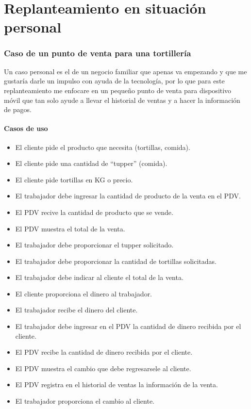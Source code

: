 \documentclass[spanish,12pt,letterpapper]{article}
\begin{document}
	\part{Replanteamiento en situación personal}
	\section{Caso de un punto de venta para una tortillería}
	Un caso personal es el de un negocio familiar que apenas va empezando y que me gustaría darle un impulso con ayuda de la tecnología, por lo que para este replanteamiento me enfocare en un pequeño punto de venta para dispositivo móvil que tan solo ayude a llevar el historial de ventas y a hacer la información de pagos.
	\subsection{Casos de uso}
	\begin{itemize}
		\item El cliente pide el producto que necesita (tortillas, comida). 
		\item El cliente pide una cantidad de ``tupper'' (comida).
		\item El cliente pide tortillas en KG o precio.
		\item El trabajador debe ingresar la cantidad de producto de la venta en el PDV.
		\item El PDV recive la cantidad de producto que se vende.
		\item El PDV muestra el total de la venta.
		\item El trabajador debe proporcionar el tupper solicitado.
		\item El trabajador debe proporcionar la cantidad de tortillas solicitadas.
		\item El trabajador debe indicar al cliente el total de la venta.
		\item El cliente proporciona el dinero al trabajador.
		\item El trabajador recibe el dinero del cliente.
		\item El trabajador debe ingresar en el PDV la cantidad de dinero recibida por el cliente.
		\item El PDV recibe la cantidad de dinero recibida por el cliente.
		\item El PDV muestra el cambio que debe regresarsele al cliente.
		\item El PDV registra en el historial de ventas la información de la venta.
		\item El trabajador proporciona el cambio al cliente.\\
	\end{itemize}
	
\end{document}
